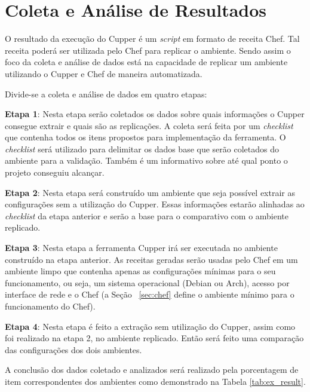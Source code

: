 \section{Coleta e Análise de Resultados}

O resultado da execução do Cupper é um \textit{script} em formato de receita Chef.
Tal receita poderá ser utilizada pelo Chef para replicar o ambiente. Sendo assim
o foco da coleta e análise de dados está na capacidade de replicar um ambiente
utilizando o Cupper e Chef de maneira automatizada.

Divide-se a coleta e análise de dados em quatro etapas:
\begin{description}
  \item \textbf{Etapa 1}: Nesta etapa serão coletados os dados sobre quais informações o Cupper consegue
extrair e quais são as replicações. A coleta será feita por um \textit{checklist} que contenha
todos os itens propostos para implementação da ferramenta. O \textit{checklist} será
utilizado para delimitar os dados base que serão coletados do ambiente para
a validação. Também é um informativo sobre até qual ponto o projeto conseguiu
alcançar.

\item \textbf{Etapa 2}: Nesta etapa será construído um ambiente que seja possível extrair as configurações
sem a utilização do Cupper. Essas informações estarão alinhadas ao \textit{checklist} da etapa
anterior e serão a base para o comparativo com o ambiente replicado.

\item \textbf{Etapa 3}: Nesta etapa a ferramenta Cupper irá ser executada no ambiente construído na etapa
anterior. As receitas geradas serão usadas pelo Chef em um ambiente limpo que contenha
apenas as configurações mínimas para o seu funcionamento, ou seja, um sistema
operacional (Debian ou Arch), acesso por interface de rede e o Chef (a Seção
~\ref{sec:chef} define o ambiente mínimo para o funcionamento do Chef).

\item \textbf{Etapa 4}: Nesta etapa é feito a extração sem utilização do Cupper, assim como foi realizado
na etapa 2, no ambiente replicado. Então será feito uma comparação das configurações
dos dois ambientes.

\end{description}

A conclusão dos dados coletado e analizados será realizado pela porcentagem de
item correspondentes dos ambientes como demonstrado na Tabela \ref{tab:ex_result}.

